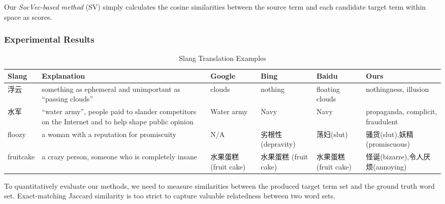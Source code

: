 Our {\em SocVec-based method} (SV) simply calculates the cosine similarities between the source term and each candidate target term within \textit{\socvec} space as scores.

\subsubsection{Experimental Results}
\begin{table*}[th!]
	\small
	\centering
	\caption{Slang Translation Examples}
	\begin{tabular}{|L{1.2cm}|L{4.7cm}|L{1.7cm}|L{1.7cm}|L{1.7cm}|L{2.8cm}|}
		\hline
		\textbf{Slang} & \textbf{Explanation} & \textbf{Google}& \textbf{Bing}& \textbf{Baidu} & \textbf{Ours} \\ \hline \hline
		浮云 &something as ephemeral and unimportant as ``passing clouds''& clouds& nothing& floating clouds & nothingness, illusion \\ \hline
		水军 &``water army'', people paid to slander competitors on the Internet and to help shape public opinion& Water army& Navy& Navy & propaganda, complicit, fraudulent\\ \hline
		floozy & a woman with a reputation for promiscuity & N/A&劣根性 (depravity)&荡妇(slut)&骚货(slut),妖精(promiscuous)\\ \hline
		fruitcake& a crazy person, someone who is completely insane & 水果蛋糕 \quad(fruit cake)&水果蛋糕 \qquad(fruit cake)&水果蛋糕 \quad(fruit cake)& 怪诞(bizarre),令人厌烦(annoying)\\ \hline
	\end{tabular}
	\label{tab:bleis_3}
\end{table*}
To quantitatively evaluate our methods, we need to measure similarities between the produced target term set and the ground truth word set. 
Exact-matching Jaccard similarity is too strict to capture valuable relatedness between two word sets.
